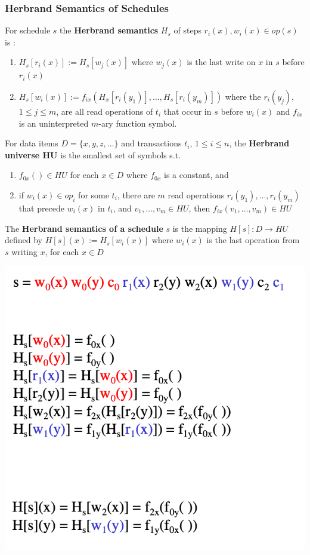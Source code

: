 \documentclass[11pt]{article}
\begin{document}
\subsubsection{Herbrand Semantics of Schedules}
\label{sec:orgff3d6d6}
\begin{definition}
For schedule \(s\) the \textbf{Herbrand semantics} \(H_s\) of steps \(r_i(x),w_i(x)\in op(s)\) is :
\begin{enumerate}
\item \(H_s[r_i(x)]:=H_s[w_j(x)]\) where \(w_j(x)\) is the last write on \(x\) in \(s\)
before \(r_i(x)\)
\item \(H_s[w_i(x)]:=f_{ix}(H_x[r_i(y_1)],\dots,H_s[r_i(y_m)])\) where
the \(r_i(y_j)\), \(1\le j\le m\), are all read operations of \(t_i\) that occur in \(s\)
before \(w_i(x)\) and \(f_{ix}\) is an uninterpreted \(m\)-ary function symbol.
\end{enumerate}
\end{definition}

\begin{definition}
For data items \(D=\{x,y,z,\dots\}\) and transactions \(t_i\), \(1\le i\le n\), the \textbf{Herbrand
universe HU} is the smallest set of symbols s.t.
\begin{enumerate}
\item \(f_{0x}()\in HU\) for each \(x\in D\) where \(f_{0x}\) is a constant, and
\item if \(w_i(x)\in op_i\) for some \(t_i\), there are \(m\) read
operations \(r_i(y_1),\dots,r_i(y_m)\) that precede \(w_i(x)\) in \(t_i\),
and \(v_1,\dots,v_m\in HU\), then \(f_{ix}(v_1,\dots,v_m)\in HU\)
\end{enumerate}
\end{definition}

\begin{definition}
The \textbf{Herbrand semantics of a schedule} \(s\) is the mapping \(H[s]:D\to HU\) defined
by \(H[s](x):=H_s[w_i(x)]\) where \(w_i(x)\) is the last operation from \(s\) writing \(x\), for
each \(x\in D\)
\end{definition}

\begin{center}
\includegraphics[width=.6\textwidth]{../images/bigdatabase/7.png}
\label{}
\end{center}
\end{document}
